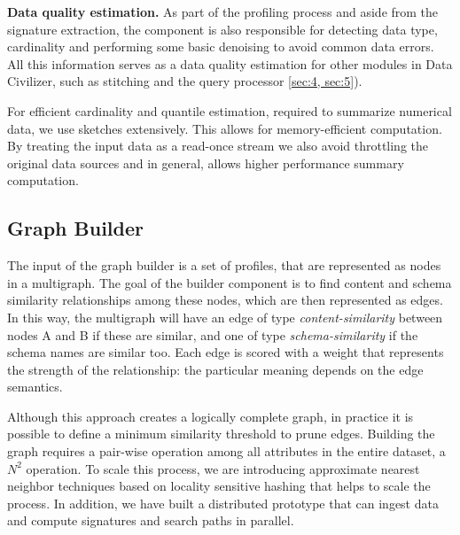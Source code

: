 \textbf{Data quality estimation.} As part of the profiling process and aside
from the signature extraction, the component is also responsible for detecting
data type, cardinality and performing some basic denoising to avoid common data
errors. All this information serves as a data quality estimation for other
modules in Data Civilizer, such as stitching and the query processor \ref{sec:4,
sec:5}). 

For efficient cardinality and quantile estimation, required to summarize
numerical data, we use sketches extensively. This allows for memory-efficient
computation. By treating the input data as a read-once stream we also avoid
throttling the original data sources and in general, allows higher performance
summary computation.

%

%

\subsection{Graph Builder} The input of the graph builder is a set of profiles,
that are represented as nodes in a multigraph. The goal of the builder component
is to find content and schema similarity relationships among these nodes, which
are then represented as edges. In this way, the multigraph will have an edge of
type \emph{content-similarity} between nodes A and B if these are similar, and
one of type \emph{schema-similarity} if the schema names are similar too. Each
edge is scored with a weight that represents the strength of the relationship:
the particular meaning depends on the edge semantics.

Although this approach creates a logically complete graph, in practice it is
possible to define a minimum similarity threshold to prune edges. Building the
graph requires a pair-wise operation among all attributes in the
entire dataset, a $N^2$ operation. To scale this process, we are introducing
approximate nearest neighbor techniques based on locality sensitive hashing \cite{DBLP:conf/compgeom/DatarIIM04}
that helps to scale the process. In addition, we have built a distributed
prototype that can ingest data and compute signatures and search paths in
parallel.


